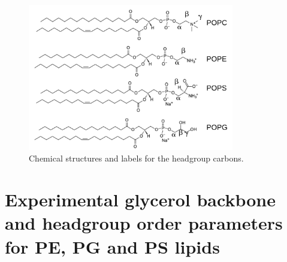 \documentclass[aps,prl,superscriptaddress,twocolumn]{revtex4}
\begin{document}



\begin{figure}[]
  \centering
  \includegraphics[width=9.0cm]{../Figs/lipids.pdf}
  \caption{\label{lipids}
    Chemical structures and labels for the headgroup carbons.
  }
\end{figure}

\section{Experimental glycerol backbone and headgroup order parameters for PE, PG and PS lipids}
\end{document}
